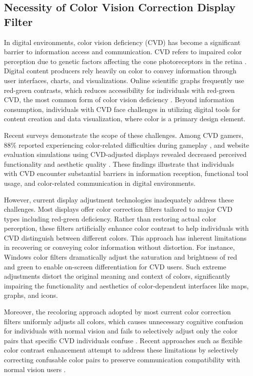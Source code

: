 \documentclass[12pt,a4paper]{article}
\begin{document}
\subsection{Necessity of Color Vision Correction Display Filter}

In digital environments, color vision deficiency (CVD) has become a significant barrier to information access and communication. CVD refers to impaired color perception due to genetic factors affecting the cone photoreceptors in the retina \parencite{Asadi2022}. Digital content producers rely heavily on color to convey information through user interfaces, charts, and visualizations. Online scientific graphs frequently use red-green contrasts, which reduces accessibility for individuals with red-green CVD, the most common form of color vision deficiency \parencite{Wong2011}. Beyond information consumption, individuals with CVD face challenges in utilizing digital tools for content creation and data visualization, where color is a primary design element.

Recent surveys demonstrate the scope of these challenges. Among CVD gamers, 88\% reported experiencing color-related difficulties during gameplay \parencite{Mazur2025}, and website evaluation simulations using CVD-adjusted displays revealed decreased perceived functionality and aesthetic quality \parencite{Jamil2024}. These findings illustrate that individuals with CVD encounter substantial barriers in information reception, functional tool usage, and color-related communication in digital environments.

However, current display adjustment technologies inadequately address these challenges. Most displays offer color correction filters tailored to major CVD types including red-green deficiency. Rather than restoring actual color perception, these filters artificially enhance color contrast to help individuals with CVD distinguish between different colors. This approach has inherent limitations in recovering or conveying color information without distortion. For instance, Windows color filters dramatically adjust the saturation and brightness of red and green to enable on-screen differentiation for CVD users. Such extreme adjustments distort the original meaning and context of colors, significantly impairing the functionality and aesthetics of color-dependent interfaces like maps, graphs, and icons.

Moreover, the recoloring approach adopted by most current color correction filters uniformly adjusts all colors, which causes unnecessary cognitive confusion for individuals with normal vision and fails to selectively adjust only the color pairs that specific CVD individuals confuse \parencite{Choi2019}. Recent approaches such as flexible color contrast enhancement attempt to address these limitations by selectively correcting confusable color pairs to preserve communication compatibility with normal vision users \parencite{Hasson2019}.
\end{document}

